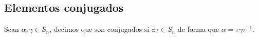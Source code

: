 
\subsection{Elementos conjugados}
\begin{definicion}
    Sean $\alpha,\gamma\in S_n$, decimos que son conjugados si $\exists \tau \in S_n$ de forma que $\alpha = \tau \gamma\tau^{-1}$.
\end{definicion}


